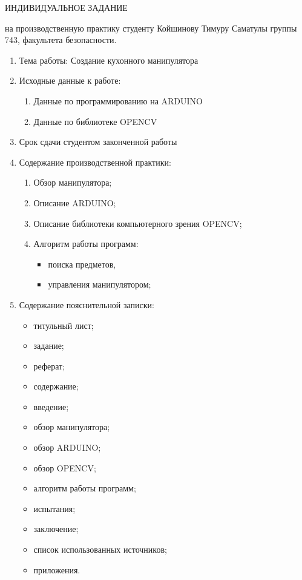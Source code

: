 \newpage

\begin{center} ИНДИВИДУАЛЬНОЕ ЗАДАНИЕ\end{center}

на производственную практику студенту Койшинову Тимуру Саматулы группы 743, факультета безопасности.

\begin{enumerate}
  \item Тема работы: Создание кухонного манипулятора
  \item Исходные данные к работе:
  \begin{enumerate}
    \item Данные по программированию на ARDUINO
    \item Данные по библиотеке OPENCV
  \end{enumerate}
  \item Срок сдачи студентом законченной работы \\ \underline{\hspace{17cm}}
  \item Содержание производственной практики:
  \begin{enumerate}
    \item Обзор манипулятора;
    \item Описание ARDUINO;
    \item Описание библиотеки компьютерного зрения OPENCV;
    \item Алгоритм работы программ:
    \begin{itemize}
      \item поиска предметов,
      \item управления манипулятором;
    \end{itemize}
	
  \end{enumerate}
  \item Содержание пояснительной записки:
  \begin{enumerate}
  \begin{itemize}
   	\item титульный лист;
   	\item задание;
    \item реферат;
   	\item содержание;
   	\item введение;
   	\item обзор манипулятора;
    \item обзор ARDUINO;
    \item обзор OPENCV;
    \item алгоритм работы программ;
    \item испытания; 
    \item заключение;
   	\item список использованных источников;
   	\item приложения.
  \end{itemize}
  \end{enumerate}


\end{enumerate}
